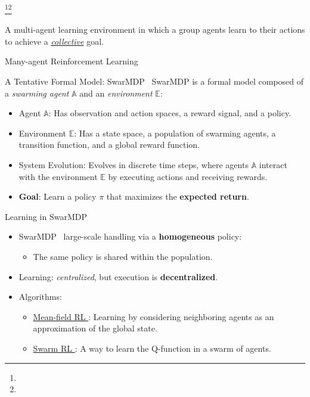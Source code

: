 \documentclass[presentation, 9pt,169]{beamer}\mode<presentation>{\usetheme{AMSBolognaFC}}
\begin{document}
\begin{frame}[plain]
  \begin{center}
\huge{\footnote{\tiny{}}}\footnote{\tiny{}}
  \end{center}
  \begin{center}
    \large{A multi-agent learning environment in which a  group agents learn to  their actions to achieve a \emph{\underline{collective}} goal}.
  \end{center}
\end{frame} 
\begin{frame}{Many-agent Reinforcement Learning}

\begin{alertblock}{A Tentative Formal Model: SwarMDP~\cite{vsovsic2016inverse}}
    SwarMDP is a formal model composed of a \emph{swarming agent} $\mathbb{A}$ and an \emph{environment} $\mathbb{E}$:
    \begin{itemize}
      \item Agent $\mathbb{A}$: Has observation and action spaces, a reward signal, and a policy.
      \item Environment $\mathbb{E}$: Has a state space, a population of swarming agents, a transition function, and a global reward function.
      \item System Evolution: Evolves in discrete time steps, where agents $\mathbb{A}$ interact with the environment $\mathbb{E}$ by executing actions and receiving rewards.
      \item \textbf{Goal}: Learn a policy $\pi$ that maximizes the \textbf{expected return}.
    \end{itemize}
\end{alertblock}

\begin{block}{Learning in SwarMDP}
  \begin{itemize}
    \item SwarMDP \faArrowRight \, large-scale handling via a \textbf{homogeneous} policy:
      \begin{itemize}
        \item The same policy is shared within the population.
      \end{itemize}
    \item Learning: \emph{centralized}, but execution is \textbf{decentralized}.
    \item Algorithms:
      \begin{itemize}
        \item \underline{Mean-field RL \cite{yang2018mean}}: Learning by considering neighboring agents as an approximation of the global state.
        \item \underline{Swarm RL \cite{iima2008swarm}}: A way to learn the Q-function in a swarm of agents.
      \end{itemize}
  \end{itemize}
\end{block}

\end{frame}
\end{document}
